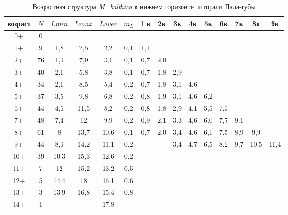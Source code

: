 \begin{landscape}
\begin{table}[h]
\caption{Возрастная структура {\it M.~balthica} в нижнем горизонте литорали Пала-губы }
\label{tab:Pala_ngl_growth_matrix}
\begin{tabular}{|c|c|cc|cc|ccccccccc|}
    \hline
возраст & $N$  & $L min$ & $L max$ & $L aver$ & $m_L$   & 1 к & 2к  & 3к  & 4к  & 5к  & 6к  & 7к  & 8к   & 9к   \\ \hline
0+      & 0  &       &       &         &         &     &     &     &     &     &     &     &      &      \\
1+      & 9  & 1,8   & 2,5   & 2,2     & 0,1     & 1,1 &     &     &     &     &     &     &      &      \\
2+      & 76 & 1,6   & 7,9   & 3,1     & 0,1     & 0,7 & 2,0 &     &     &     &     &     &      &      \\
3+      & 40 & 2,1   & 5,8   & 3,8     & 0,1     & 0,7 & 1,8 & 2,9 &     &     &     &     &      &      \\
4+      & 34 & 2,1   & 8,5   & 5,4     & 0,2     & 0,7 & 1,8 & 3,1 & 4,6 &     &     &     &      &      \\
5+      & 37 & 3,5   & 9,8   & 6,8     & 0,2     & 0,8 & 1,9 & 3,1 & 4,6 & 6,2 &     &     &      &      \\
6+      & 44 & 4,6   & 11,5  & 8,2     & 0,2     & 0,8 & 1,8 & 2,9 & 4,1 & 5,5 & 7,3 &     &      &      \\
7+      & 48 & 7,4   & 12    & 9,9     & 0,2     & 0,9 & 2,1 & 3,3 & 4,6 & 6,0 & 7,7 & 9,1 &      &      \\
8+      & 61 & 8     & 13,7  & 10,6    & 0,1     & 0,7 & 2,0 & 3,4 & 4,6 & 6,1 & 7,5 & 8,9 & 9,9  &      \\
9+      & 44 & 8,6   & 14,2  & 11,1    & 0,2     &   &   & 3,4 & 4,7 & 6,5 & 8,2 & 9,7 & 10,5 & 11,4 \\
10+     & 39 & 10,3  & 15,3  & 12,6    & 0,2     &     &     &     &     &     &     &     &      &      \\
11+     & 7  & 12    & 15,2  & 13,2    & 0,5     &     &     &     &     &     &     &     &      &      \\
12+     & 5  & 14,4  & 18    & 16,1    & 0,6     &     &     &     &     &     &     &     &      &      \\
13+     & 3  & 13,9  & 16,8  & 15,4    & 0,8     &     &     &     &     &     &     &     &      &      \\
14+     & 1  &     &     & 17,8    &         &     &     &     &     &     &     &     &      &      \\\hline

\end{tabular}
\end{table}
\end{landscape}
